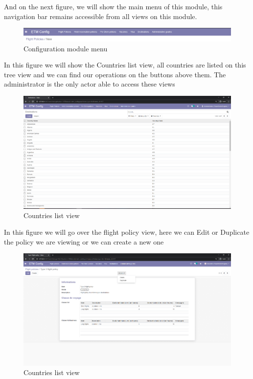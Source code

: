 And on the next figure, we will show the main menu of this module, this navigation bar remains accessible from all views on this module.
\begin{figure}[H]
    \centering
    \includegraphics[scale=0.43]{img/c_config_menu.png}
    \caption{Configuration module menu}
    \label{fig:my_label}
\end{figure}
In this figure we will show the Countries list view, all countries are listed on this tree view and we can find our operations on the buttons above them. The administrator is the only actor able to access these views
\begin{figure}[H]
    \centering
    \includegraphics[scale=0.32]{img/c_country_list.png}
    \caption{Countries list view}
    \label{fig:my_label}
\end{figure}
In this figure we will go over the flight policy view, here we can Edit or Duplicate the policy we are viewing or we can create a new one
\begin{figure}[H]
    \centering
    \includegraphics[scale=0.32]{img/c_flight_policy.png}
    \caption{Countries list view}
    \label{fig:my_label}
\end{figure}
